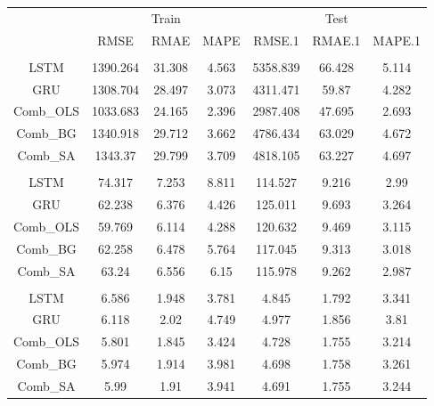 \documentclass[
]{article}
\begin{document}
\begin{tabular}[t]{ccccccc}
\toprule
\multicolumn{1}{c}{ } & \multicolumn{3}{c}{Train} & \multicolumn{3}{c}{Test} \\
\cmidrule(l{3pt}r{3pt}){2-4} \cmidrule(l{3pt}r{3pt}){5-7}
 & RMSE & RMAE & MAPE & RMSE.1 & RMAE.1 & MAPE.1\\
\midrule
\addlinespace[0.3em]
\multicolumn{7}{l}{\textbf{BTC}}\\
\hspace{1em}LSTM & 1390.264 & 31.308 & 4.563 & 5358.839 & 66.428 & 5.114\\
\hspace{1em}GRU & 1308.704 & 28.497 & 3.073 & 4311.471 & 59.87 & 4.282\\
\hspace{1em}Comb\_OLS & 1033.683 & 24.165 & 2.396 & 2987.408 & 47.695 & 2.693\\
\hspace{1em}Comb\_BG & 1340.918 & 29.712 & 3.662 & 4786.434 & 63.029 & 4.672\\
\hspace{1em}Comb\_SA & 1343.37 & 29.799 & 3.709 & 4818.105 & 63.227 & 4.697\\
\addlinespace[0.3em]
\multicolumn{7}{l}{\textbf{ETH}}\\
\hspace{1em}LSTM & 74.317 & 7.253 & 8.811 & 114.527 & 9.216 & 2.99\\
\hspace{1em}GRU & 62.238 & 6.376 & 4.426 & 125.011 & 9.693 & 3.264\\
\hspace{1em}Comb\_OLS & 59.769 & 6.114 & 4.288 & 120.632 & 9.469 & 3.115\\
\hspace{1em}Comb\_BG & 62.258 & 6.478 & 5.764 & 117.045 & 9.313 & 3.018\\
\hspace{1em}Comb\_SA & 63.24 & 6.556 & 6.15 & 115.978 & 9.262 & 2.987\\
\addlinespace[0.3em]
\multicolumn{7}{l}{\textbf{LTC}}\\
\hspace{1em}LSTM & 6.586 & 1.948 & 3.781 & 4.845 & 1.792 & 3.341\\
\hspace{1em}GRU & 6.118 & 2.02 & 4.749 & 4.977 & 1.856 & 3.81\\
\hspace{1em}Comb\_OLS & 5.801 & 1.845 & 3.424 & 4.728 & 1.755 & 3.214\\
\hspace{1em}Comb\_BG & 5.974 & 1.914 & 3.981 & 4.698 & 1.758 & 3.261\\
\hspace{1em}Comb\_SA & 5.99 & 1.91 & 3.941 & 4.691 & 1.755 & 3.244\\
\bottomrule
\end{tabular}
\end{document}
